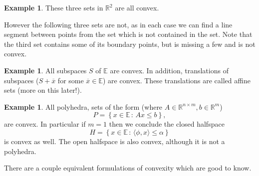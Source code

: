 \documentclass[11pt]{article}
\numberwithin{equation}{section}
\theoremstyle{definition}
\newtheorem{example}[theorem]{Example}
\newcommand{\bE}{\mathbb{E}}
\newcommand{\bR}{\mathbb{R}}
\newcommand{\set}[2]{\left\{#1\,:\,#2\right\}}
\begin{document}
\begin{example}
    These three sets in $\bR^2$ are all convex. 
    \begin{center}
    \end{center}
    
    However the following three sets are not, as in each case we can find a line segment between points from the set which is not contained in the set. Note that the third set contains some of its boundary points, but is missing a few and is not convex.
    \begin{center}
    \end{center}
\end{example}
\begin{example}
    All subspaces $S$ of $\bE$ are convex. In addition, translations of subspaces ($S+\overline x$ for some $\overline x\in\bE$) are convex. These translations are called affine sets (more on this later!).
\end{example}
\begin{example}
    All polyhedra, sets of the form (where $A\in\bR^{n\times m}, b\in\bR^m$)
    \begin{equation}
        P=\set{x\in\bE}{Ax\le b},
    \end{equation}
    are convex. In particular if $m=1$ then we conclude the closed halfspace
    \begin{equation}
        H=\set{x\in\bE}{\langle\phi, x\rangle \le \alpha}
    \end{equation}
    is convex as well. The open halfspace is also convex, although it is not a polyhedra.
\end{example}
There are a couple equivalent formulations of convexity which are good to know.
\end{document}
